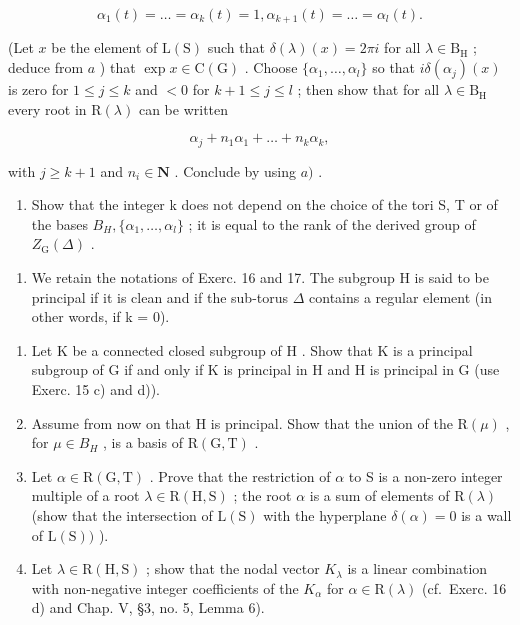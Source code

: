 \[
\alpha_ {1} (t) = \dots = \alpha_ {k} (t) = 1, \alpha_ {k + 1} (t) = \dots = \alpha_ {l} (t).
\]

(Let \(x\) be the element of \(\mathrm{L}(\mathrm{S})\) such that \(\delta(\lambda)(x) = 2\pi i\) for all \(\lambda \in \mathrm{B}_{\mathrm{H}}\) ; deduce from \(a\) ) that \(\exp x \in \mathrm{C}(\mathrm{G})\) . Choose \(\{\alpha_1, \ldots, \alpha_l\}\) so that \(i\delta(\alpha_j)(x)\) is zero for \(1 \leq j \leq k\) and \(< 0\) for \(k + 1 \leq j \leq l\) ; then show that for all \(\lambda \in \mathrm{B}_{\mathrm{H}}\) every root in \(\mathrm{R}(\lambda)\) can be written

\[
\alpha_ {j} + n _ {1} \alpha_ {1} + \dots + n _ {k} \alpha_ {k},
\]

with \(j \geq k + 1\) and \(n_i \in \mathbf{N}\) . Conclude by using \(a)\) .

\begin{enumerate}
\def\labelenumi{\alph{enumi})}
\setcounter{enumi}{2}
\tightlist
\item
  Show that the integer k does not depend on the choice of the tori S, T or of the bases \(B_{H}, \{\alpha_{1}, \ldots, \alpha_{l}\}\) ; it is equal to the rank of the derived group of \(Z_{\mathrm{G}}(\Delta)\) .
\end{enumerate}

\begin{enumerate}
\def\labelenumi{\arabic{enumi})}
\setcounter{enumi}{17}
\tightlist
\item
  We retain the notations of Exerc. 16 and 17. The subgroup H is said to be principal if it is clean and if the sub-torus \(\Delta\) contains a regular element (in other words, if k = 0).
\end{enumerate}

\begin{enumerate}
\def\labelenumi{\alph{enumi})}
\item
  Let \(\mathrm{K}\) be a connected closed subgroup of \(\mathrm{H}\) . Show that \(\mathrm{K}\) is a principal subgroup of \(\mathrm{G}\) if and only if \(\mathrm{K}\) is principal in \(\mathrm{H}\) and \(\mathrm{H}\) is principal in \(\mathrm{G}\) (use Exerc. 15 c) and d)).
\item
  Assume from now on that H is principal. Show that the union of the \(\mathrm{R}(\mu)\) , for \(\mu \in B_{H}\) , is a basis of \(\mathrm{R}(\mathrm{G}, \mathrm{T})\) .
\item
  Let \(\alpha \in \mathrm{R}(\mathrm{G},\mathrm{T})\) . Prove that the restriction of \(\alpha\) to S is a non-zero integer multiple of a root \(\lambda \in \mathrm{R}(\mathrm{H},\mathrm{S})\) ; the root \(\alpha\) is a sum of elements of \(\mathrm{R}(\lambda)\) (show that the intersection of \(\mathrm{L}(\mathrm{S})\) with the hyperplane \(\delta (\alpha) = 0\) is a wall of \(\mathrm{L}(\mathrm{S}))\) ).
\item
  Let \(\lambda\in\mathrm{R}(\mathrm{H},\mathrm{S})\) ; show that the nodal vector \(K_{\lambda}\) is a linear combination with non-negative integer coefficients of the \(K_{\alpha}\) for \(\alpha\in\mathrm{R}(\lambda)\) (cf.~Exerc. 16 d) and Chap. V, §3, no. 5, Lemma 6).
\end{enumerate}

